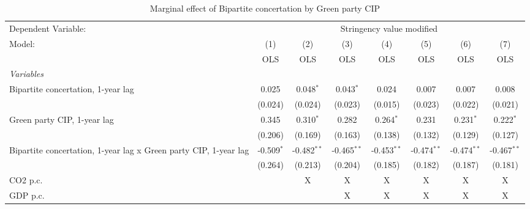 
\begin{table}[htbp]
   \caption{Marginal effect of Bipartite concertation by Green party CIP}
   \centering
   \begin{tabular}{lccccccc}
      \toprule
      Dependent Variable: & \multicolumn{7}{c}{Stringency value modified}\\
      Model:                                                           & (1)          & (2)           & (3)           & (4)           & (5)           & (6)           & (7)\\  
                                                                       &  OLS         & OLS           & OLS           & OLS           & OLS           & OLS           & OLS\\  
      \midrule
      \emph{Variables}\\
      Bipartite concertation, 1-year lag                               & 0.025        & 0.048$^{*}$   & 0.043$^{*}$   & 0.024         & 0.007         & 0.007         & 0.008\\   
                                                                       & (0.024)      & (0.024)       & (0.023)       & (0.015)       & (0.023)       & (0.022)       & (0.021)\\   
      Green party CIP, 1-year lag                                      & 0.345        & 0.310$^{*}$   & 0.282         & 0.264$^{*}$   & 0.231         & 0.231$^{*}$   & 0.222$^{*}$\\   
                                                                       & (0.206)      & (0.169)       & (0.163)       & (0.138)       & (0.132)       & (0.129)       & (0.127)\\   
      Bipartite concertation, 1-year lag x Green party CIP, 1-year lag & -0.509$^{*}$ & -0.482$^{**}$ & -0.465$^{**}$ & -0.453$^{**}$ & -0.474$^{**}$ & -0.474$^{**}$ & -0.467$^{**}$\\   
                                                                       & (0.264)      & (0.213)       & (0.204)       & (0.185)       & (0.182)       & (0.187)       & (0.181)\\   
      CO2 p.c.                                                         &              & X             & X             & X             & X             & X             & X\\  
      GDP p.c.                                                         &              &               & X             & X             & X             & X             & X\\  

\end{tabular}
\end{table}

